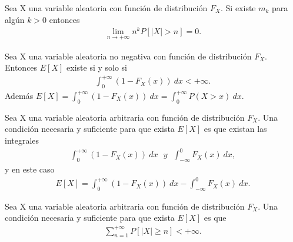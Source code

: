 \begin{teo}
    Sea X una variable aleatoria con función de distribución $F_X$. Si existe $m_k$ para algún $k > 0$ entonces
    \begin{align*}
        \lim_{n \to +\infty}{n^kP[|X| > n]} = 0.
    \end{align*}
\end{teo}

\begin{teo}
    Sea X una variable aleatoria no negativa con función de distribución $F_X$. Entonces $E[X]$ existe si y solo si
    \begin{align*}
        \int_{0}^{+\infty}{(1 - F_X(x)) \ dx} < +\infty.
    \end{align*}
    Además $E[X] = \int_{0}^{+\infty}{(1 - F_X(x)) \ dx} = \int_{0}^{+\infty}{P(X > x)\ dx}$.
\end{teo}

\begin{teo}
    Sea X una variable aleatoria arbitraria con función de distribución $F_X$. Una condición necesaria y suficiente para que exista $E[X]$ es que existan las integrales
    \begin{align*}
        \int_{0}^{+\infty}{(1 - F_X(x)) \ dx} \ \ \ y \ \ \ \int_{-\infty}^{0}{F_X(x) \ dx},
    \end{align*}
    y en este caso
    \begin{align*}
        E[X] = \int_{0}^{+\infty}{(1 - F_X(x)) \ dx} - \int_{-\infty}^{0}{F_X(x) \ dx}.
    \end{align*}
\end{teo}

\begin{teo}
    Sea X una variable aleatoria arbitraria con función de distribución $F_X$. Una condición necesaria y suficiente para que exista $E[X]$ es que
    \begin{align*}
        \sum_{n=1}^{+\infty}{P[|X|\ge n]} < +\infty.
    \end{align*}
\end{teo}